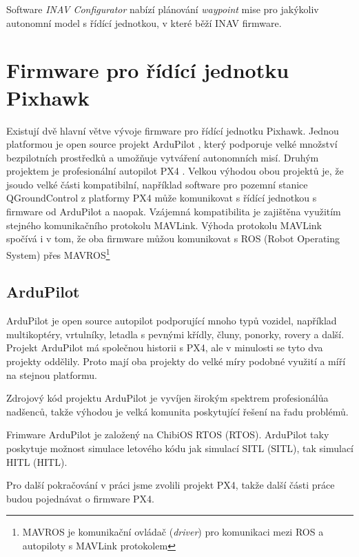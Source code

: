 Software\textbf{} \textit{INAV Configurator} nabízí plánování \textit{waypoint} mise pro jakýkoliv autonomní model s řídící jednotkou, v které běží INAV firmware.

\section{Firmware pro řídící jednotku Pixhawk}

Existují dvě hlavní větve vývoje firmware pro řídící jednotku Pixhawk. Jednou platformou je open source projekt ArduPilot \cite{ARDU}, který podporuje velké množství bezpilotních prostředků a umožňuje vytváření autonomních misí. Druhým projektem je profesionální autopilot PX4 \cite{PX4ORG}. Velkou výhodou obou projektů je, že jsou\break do velké části kompatibilní, například software pro pozemní stanice QGroundControl z platformy PX4 může komunikovat s řídící jednotkou s firmware od ArduPilot a naopak. Vzájemná kompatibilita je zajištěna využitím stejného komunikačního protokolu MAVLink. Výhoda protokolu MAVLink spočívá i v tom, že oba firmware můžou komunikovat s ROS (Robot Operating System) přes MAVROS\footnote{MAVROS je komunikační ovládač (\textit{driver}) pro komunikaci mezi ROS a autopiloty s MAVLink protokolem}

\subsection{ArduPilot}

ArduPilot je open source autopilot podporující mnoho typů vozidel, například multikoptéry, vrtulníky, letadla s pevnými křídly, čluny, ponorky, rovery a další. Projekt ArduPilot má společnou historii s PX4, ale v minulosti se tyto dva projekty oddělily. Proto mají oba projekty do velké míry podobné využití a míří na stejnou platformu.

Zdrojový kód projektu ArduPilot je vyvíjen širokým spektrem profesionálů\break a nadšenců, takže výhodou je velká komunita poskytující řešení na řadu problémů.

Frimware ArduPilot je založený na ChibiOS \acs{RTOS} (\acl{RTOS}). ArduPilot taky poskytuje možnost simulace letového kódu jak simulací \acs{SITL} (\acl{SITL}), tak simulací \acs{HITL} (\acl{HITL}). \cite{ARDU}

Pro další pokračování v práci jsme zvolili projekt PX4, takže další části práce budou pojednávat o firmware PX4.

